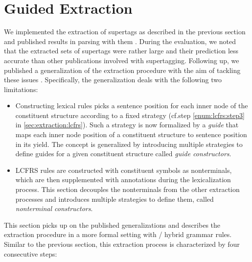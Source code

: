 \documentclass[../../document.tex]{subfiles}
\begin{document}
    \section{Guided Extraction} \label{sec:extraction:guided}
    We implemented the extraction of  supertags as described in the previous section and published results in parsing with them \citep{RupMoe21}.
    During the evaluation, we noted that the extracted sets of supertags were rather large and their prediction less accurate than other publications involved with supertagging.
    Following up, we published a generalization of the extraction procedure with the aim of tackling these issues \citep{Rup22}.
    Specifically, the generalization deals with the following two limitations:
    \begin{itemize}
        \item
            Constructing lexical  rules picks a sentence position for each inner node of the constituent structure according to a fixed strategy (cf.\@ step \ref{enum:lcfrs:step3} in \cref{sec:extraction:lcfrs}).
            Such a strategy is now formalized by a \emph{guide} that maps each inner node position of a constituent structure to sentence position in its yield.
            The concept is generalized by introducing multiple strategies to define guides for a given constituent structure called \emph{guide constructors}.
        \item
            LCFRS rules are constructed with constituent symbols as nonterminals, which are then supplemented with annotations during the lexicalization process.
            This section decouples the nonterminals from the other extraction processes and introduces multiple strategies to define them, called \emph{nonterminal constructors}.
    \end{itemize}
    This section picks up on the published generalizations and describes the extraction procedure in a more formal setting with / hybrid grammar rules.
    Similar to the previous section, this extraction process is characterized by four consecutive steps:
\end{document}
